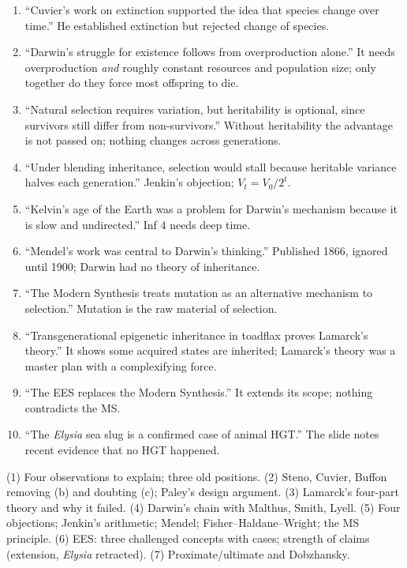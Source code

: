 \begin{statements}
\begin{enumerate}[label=\arabic*.]
\item ``Cuvier's work on extinction supported the idea that species change over time.''
\F He established extinction but rejected change of species.
\item ``Darwin's struggle for existence follows from overproduction alone.''
\F It needs overproduction \emph{and} roughly constant resources and population size; only together do they force most
offspring to die.
\item ``Natural selection requires variation, but heritability is optional, since survivors still differ from non-survivors.''
\F Without heritability the advantage is not passed on; nothing changes across generations.
\item ``Under blending inheritance, selection would stall because heritable variance halves each generation.''
\T Jenkin's objection; $V_t=V_0/2^t$.
\item ``Kelvin's age of the Earth was a problem for Darwin's mechanism because it is slow and undirected.''
\T Inf 4 needs deep time.
\item ``Mendel's work was central to Darwin's thinking.''
\F Published 1866, ignored until 1900; Darwin had no theory of inheritance.
\item ``The Modern Synthesis treats mutation as an alternative mechanism to selection.''
\F Mutation is the raw material of selection.
\item ``Transgenerational epigenetic inheritance in toadflax proves Lamarck's theory.''
\F It shows some acquired states are inherited; Lamarck's theory was a master plan with a complexifying force.
\item ``The EES replaces the Modern Synthesis.''
\F It extends its scope; nothing contradicts the MS.
\item ``The \emph{Elysia} sea slug is a confirmed case of animal HGT.''
\F The slide notes recent evidence that no HGT happened.
\end{enumerate}
\end{statements}

\begin{longans}
(1) Four observations to explain; three old positions. (2) Steno, Cuvier, Buffon removing (b) and doubting (c); Paley's
design argument. (3) Lamarck's four-part theory and why it failed. (4) Darwin's chain with Malthus, Smith, Lyell.
(5) Four objections; Jenkin's arithmetic; Mendel; Fisher--Haldane--Wright; the MS principle. (6) EES: three challenged
concepts with cases; strength of claims (extension, \emph{Elysia} retracted). (7) Proximate/ultimate and Dobzhansky.
\end{longans}
